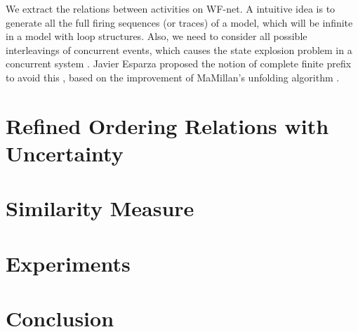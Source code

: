 \documentclass{llncs}
\begin{document}
We extract the relations between activities on WF-net. A intuitive idea is to generate all the full firing sequences (or traces) of a model, which will be infinite in a model with loop structures. Also, we need to consider all possible interleavings of concurrent events, which causes the state explosion problem in a concurrent system \cite{mcmillan1995technique}. Javier Esparza proposed the notion of complete finite prefix to avoid this \cite{esparza1996improvement}, based on the improvement of MaMillan's unfolding algorithm \cite{mcmillan1995technique}.


\section{Refined Ordering Relations with Uncertainty}\label{sec:relations}

\section{Similarity Measure}\label{sec:similarity}

\section{Experiments}\label{sec:experiments}

\section{Conclusion}\label{sec:conclusion}




\end{document}
